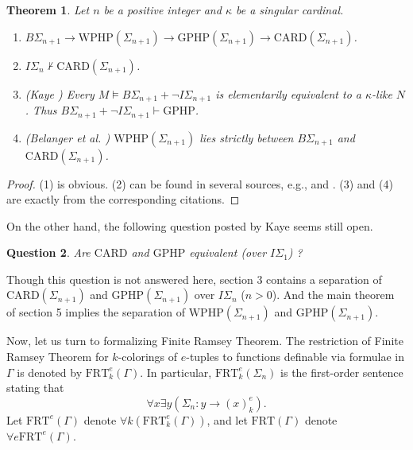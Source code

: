 \documentclass[twoside,a4paper]{amsart}
\newtheorem{theorem}{Theorem}[section]
\newtheorem{question}[theorem]{Question}
\theoremstyle{definition}
\theoremstyle{theorem}
\numberwithin{equation}{section}
\newcommand{\<}{\langle}
\renewcommand{\>}{\rangle}
\newcommand{\CARD}{\mathrm{CARD}}
\newcommand{\WPHP}{\mathrm{WPHP}}
\newcommand{\GPHP}{\mathrm{GPHP}}
\newcommand{\FRT}{\mathrm{FRT}}
\begin{document}
\begin{theorem}\label{thm:knowns}
Let $n$ be a positive integer and $\kappa$ be a singular cardinal.
\begin{enumerate}
  \item $B\Sigma_{n+1} \to \WPHP(\Sigma_{n+1}) \to \GPHP(\Sigma_{n+1}) \to \CARD(\Sigma_{n+1})$.
  \item $I\Sigma_n \not\vdash \CARD(\Sigma_{n+1})$.
  \item (Kaye \cite{Kaye:1997.JLMC}) Every $M \models B\Sigma_{n+1} + \neg I\Sigma_{n+1}$ is elementarily equivalent to a $\kappa$-like $N$.
  Thus $B\Sigma_{n+1} + \neg I\Sigma_{n+1} \vdash \GPHP$.
  \item (Belanger et al. \cite{BCWWY:2021}) $\WPHP(\Sigma_{n+1})$ lies strictly between $B\Sigma_{n+1}$ and $\CARD(\Sigma_{n+1})$.
\end{enumerate}
\end{theorem}

\begin{proof}
(1) is obvious.
(2) can be found in several sources, e.g., \cite[Lemma 3.4]{Seetapun.Slaman:1995} and \cite[Proposition 3.2]{Kaye:1995.NDJFL}.
(3) and (4) are exactly from the corresponding citations.
\end{proof}

On the other hand, the following question posted by Kaye \cite{Kaye:1995.NDJFL} seems still open.

\begin{question}
Are $\CARD$ and $\GPHP$ equivalent (over $I\Sigma_1$) ?
\end{question}

Though this question is not answered here, section 3 contains a separation of $\CARD(\Sigma_{n+1})$ and $\GPHP(\Sigma_{n+1})$ over $I\Sigma_n$ ($n > 0$).
And the main theorem of section 5 implies the separation of $\WPHP(\Sigma_{n+1})$ and $\GPHP(\Sigma_{n+1})$.

Now, let us turn to formalizing Finite Ramsey Theorem.
The restriction of Finite Ramsey Theorem for $k$-colorings of $e$-tuples to functions definable via formulae in $\Gamma$ is denoted by $\FRT^e_k(\Gamma)$.
In particular, $\FRT^e_k(\Sigma_n)$ is the first-order sentence stating that
\[
  \forall x \exists y (\Sigma_n: y \to (x)^e_k).
\]
Let $\FRT^e(\Gamma)$ denote $\forall k (\FRT^e_k(\Gamma))$,
and let $\FRT(\Gamma)$ denote $\forall e \FRT^e(\Gamma)$.
\end{document}
